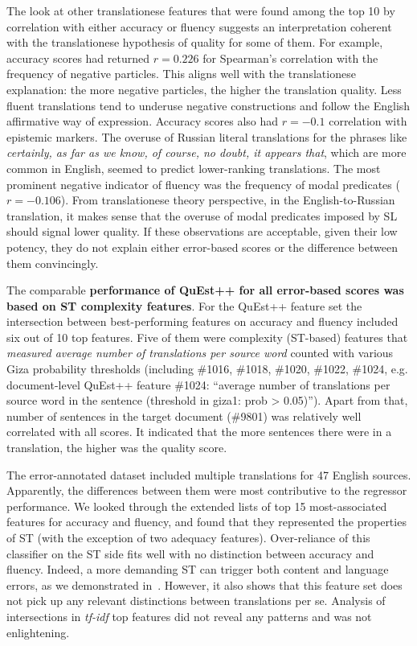 \label{pg:errors_some_coherence_with_translationese_theory_of_quality}
The look at other translationese features that were found among the top 10 by correlation with either accuracy or fluency suggests an interpretation coherent with the translationese hypothesis of quality for some of them. 
For example, accuracy scores had returned $r=0.226$ for Spearman's correlation with the frequency of negative particles. This aligns well with the translationese explanation: the more negative particles, the higher the translation quality. Less fluent translations tend to underuse negative constructions and follow the English affirmative way of expression. Accuracy scores also had $r=-0.1$ correlation with epistemic markers. The overuse of Russian literal translations for the phrases like \textit{certainly, as far as we know, of course, no doubt, it appears that}, which are more common in English, seemed to predict lower-ranking translations. The most prominent negative indicator of fluency was the frequency of modal predicates ($r=-0.106$). From translationese theory perspective, in the English-to-Russian translation, it makes sense that the overuse of modal predicates imposed by SL should signal lower quality.
If these observations are acceptable, given their low potency, they do not explain either error-based scores or the difference between them convincingly.   

\label{pg:quest_feats4err}
The comparable \textbf{performance of QuEst++ for all error-based scores was based on ST complexity features}.
For the QuEst++ feature set the intersection between best-performing features on accuracy and fluency included six out of 10 top features. Five of them were complexity (ST-based) features that \textit{measured average number of translations per source word} counted with various Giza probability thresholds (including \#1016, \#1018, \#1020, \#1022, \#1024, e.g. document-level QuEst++ feature \#1024: ``average number of translations per source word in the sentence (threshold in giza1: prob > 0.05)''). Apart from that, number of sentences in the target document (\#9801) was relatively well correlated with all scores. It indicated that the more sentences there were in a translation, the higher was the quality score.

The error-annotated dataset included multiple translations for 47 English sources. Apparently, the differences between them were most contributive to the regressor performance. We looked through the extended lists of top 15 most-associated features for accuracy and fluency, and found that they represented the properties of ST (with  the exception of two adequacy features). Over-reliance of this classifier on the ST side fits well with no distinction between accuracy and fluency. Indeed, a more demanding ST can trigger both content and language errors, as we demonstrated in~\cite{Kunilovskaya2022err}.
However, it also shows that this feature set does not pick up any relevant distinctions between translations per se. Analysis of intersections in \textit{tf-idf} top features did not reveal any patterns and was not enlightening. 

